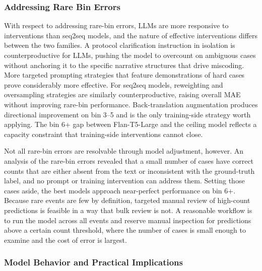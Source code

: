 \documentclass[
  11pt,
]{article}
\begin{document}
\subsubsection{Addressing Rare Bin
Errors}\label{addressing-rare-bin-errors}

With respect to addressing rare-bin errors, LLMs are more responsive to
interventions than seq2seq models, and the nature of effective
interventions differs between the two families. A protocol clarification
instruction in isolation is counterproductive for LLMs, pushing the
model to overcount on ambiguous cases without anchoring it to the
specific narrative structures that drive miscoding. More targeted
prompting strategies that feature demonstrations of hard cases prove
considerably more effective. For seq2seq models, reweighting and
oversampling strategies are similarly counterproductive, raising overall
MAE without improving rare-bin performance. Back-translation
augmentation produces directional improvement on bin 3--5 and is the
only training-side strategy worth applying. The bin 6+ gap between
Flan-T5-Large and the ceiling model reflects a capacity constraint that
training-side interventions cannot close.

Not all rare-bin errors are resolvable through model adjustment,
however. An analysis of the rare-bin errors revealed that a small number
of cases have correct counts that are either absent from the text or
inconsistent with the ground-truth label, and no prompt or training
intervention can address them. Setting those cases aside, the best
models approach near-perfect performance on bin 6+. Because rare events
are few by definition, targeted manual review of high-count predictions
is feasible in a way that bulk review is not. A reasonable workflow is
to run the model across all events and reserve manual inspection for
predictions above a certain count threshold, where the number of cases
is small enough to examine and the cost of error is largest.

\subsubsection{Model Behavior and Practical
Implications}\label{model-behavior-and-practical-implications}
\end{document}
